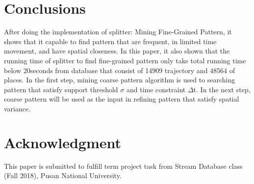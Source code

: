 \documentclass[conference]{IEEEtran}
\begin{document}
\section{Conclusions}
After doing the implementation of splitter: Mining Fine-Grained Pattern, it shows that it capable to find pattern that are frequent, in limited time movement, and have spatial closeness. In this paper, it also shown that the running time of splitter to find fine-grained pattern only take total running time below 20seconds from database that consist of 14909 trajectory and 48564 of places. In the first step, mining coarse pattern algorithm is used to searching pattern that satisfy support threshold $\sigma$ and time constraint $\Delta$t. In the next step, coarse pattern will be used as the input in refining pattern that satisfy spatial variance.   



\section*{Acknowledgment}
This paper is submitted to fulfill term project task from Stream Database class (Fall 2018), Pusan National University.



\end{document}
